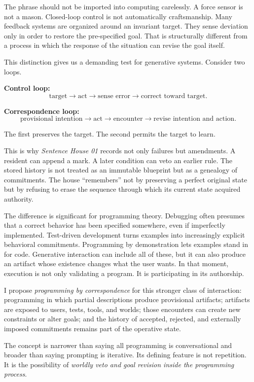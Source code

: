 \documentclass[11pt]{article}
\begin{document}
The phrase should not be imported into computing carelessly. A force sensor is not a mason. Closed-loop control is not automatically craftsmanship. Many feedback systems are organized around an invariant target. They sense deviation only in order to restore the pre-specified goal. That is structurally different from a process in which the response of the situation can revise the goal itself.

This distinction gives us a demanding test for generative systems. Consider two loops.

\textbf{Control loop:}
\[
\text{target} \rightarrow \text{act} \rightarrow \text{sense error} \rightarrow \text{correct toward target}.
\]

\textbf{Correspondence loop:}
\[
\text{provisional intention} \rightarrow \text{act} \rightarrow \text{encounter} \rightarrow \text{revise intention and action}.
\]

The first preserves the target. The second permits the target to learn.

This is why \emph{Sentence House 01} records not only failures but amendments. A resident can append a mark. A later condition can veto an earlier rule. The stored history is not treated as an immutable blueprint but as a genealogy of commitments. The house ``remembers'' not by preserving a perfect original state but by refusing to erase the sequence through which its current state acquired authority.

The difference is significant for programming theory. Debugging often presumes that a correct behavior has been specified somewhere, even if imperfectly implemented. Test-driven development turns examples into increasingly explicit behavioral commitments. Programming by demonstration lets examples stand in for code. Generative interaction can include all of these, but it can also produce an artifact whose existence changes what the user wants. In that moment, execution is not only validating a program. It is participating in its authorship.

I propose \emph{programming by correspondence} for this stronger class of interaction: programming in which partial descriptions produce provisional artifacts; artifacts are exposed to users, tests, tools, and worlds; those encounters can create new constraints or alter goals; and the history of accepted, rejected, and externally imposed commitments remains part of the operative state.

The concept is narrower than saying all programming is conversational and broader than saying prompting is iterative. Its defining feature is not repetition. It is the possibility of \emph{worldly veto and goal revision inside the programming process}.
\end{document}
